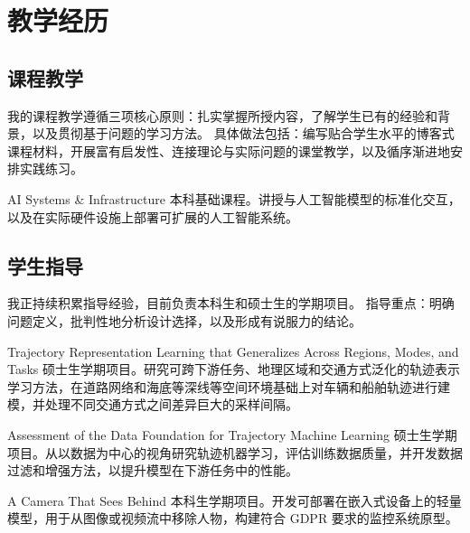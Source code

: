 \label{sec:teaching-experience}
\section*{教学经历}

\subsection*{课程教学}
我的课程教学遵循三项核心原则：扎实掌握所授内容，了解学生已有的经验和背景，以及贯彻基于问题的学习方法。
具体做法包括：编写贴合学生水平的博客式课程材料，开展富有启发性、连接理论与实际问题的课堂教学，以及循序渐进地安排实践练习。

{AI Systems \& Infrastructure}
{}
{本科基础课程。讲授与人工智能模型的标准化交互，以及在实际硬件设施上部署可扩展的人工智能系统。}

\subsection*{学生指导}
我正持续积累指导经验，目前负责本科生和硕士生的学期项目。
指导重点：明确问题定义，批判性地分析设计选择，以及形成有说服力的结论。

{Trajectory Representation Learning that Generalizes Across Regions, Modes, and Tasks}
{}
{硕士生学期项目。研究可跨下游任务、地理区域和交通方式泛化的轨迹表示学习方法，在道路网络和海底等深线等空间环境基础上对车辆和船舶轨迹进行建模，并处理不同交通方式之间差异巨大的采样间隔。}

{Assessment of the Data Foundation for Trajectory Machine Learning}
{}
{硕士生学期项目。从以数据为中心的视角研究轨迹机器学习，评估训练数据质量，并开发数据过滤和增强方法，以提升模型在下游任务中的性能。}

{A Camera That Sees Behind}
{}
{本科生学期项目。开发可部署在嵌入式设备上的轻量模型，用于从图像或视频流中移除人物，构建符合 GDPR 要求的监控系统原型。}
